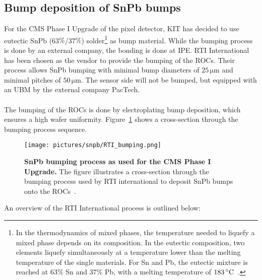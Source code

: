 \subsection{Bump deposition of SnPb bumps}\label{sec:RTI_bumping}
For the \ac{CMS} Phase I Upgrade of the pixel detector, \ac{KIT} has decided to use eutectic SnPb (63$\%$/37$\%$) solder\footnote{In the thermodynamics of mixed phases, the temperature needed to liquefy a mixed phase depends on its composition. In the eutectic composition, two elements liquefy simultaneously at a temperature lower than the melting temperature of the single materials. For Sn and Pb, the eutectic mixture is reached at $63\%$ Sn and $37\%$ Pb, with a melting temperature of $183\,\rm{^\circ C}$~\cite{Mul14}.} as bump material. While the bumping process is done by an external company, the bonding is done at \ac{IPE}. \acs{RTI} International has been chosen as the vendor to provide the bumping of the \ac{ROC}s. Their process allows SnPb bumping with minimal bump diameters of $25\,\si{\micro \meter}$ and minimal pitches of $50\,\si{\micro \meter}$. The sensor side will not be bumped, but equipped with an \ac{UBM} by the external company PacTech.\\
\\The bumping of the \ac{ROC}s is done by electroplating bump deposition, which ensures a high wafer uniformity. Figure~\ref{fig:RTI_bumping} shows a cross-section through the bumping process sequence.
\begin{figure}
\begin{center}
\texttt{[image: pictures/snpb/RTI\_bumping.png]}
\end{center}
\caption[SnPb bumping process as used for the CMS Phase I Upgrade]{\textbf{SnPb bumping process as used for the \ac{CMS} Phase I Upgrade.} The figure illustrates a cross-section through the bumping process used by RTI international to deposit SnPb bumps onto the \ac{ROC}s~\cite{Huf04}.}\label{fig:RTI_bumping}
\end{figure}
An overview of the \acs{RTI} International process is outlined below:
